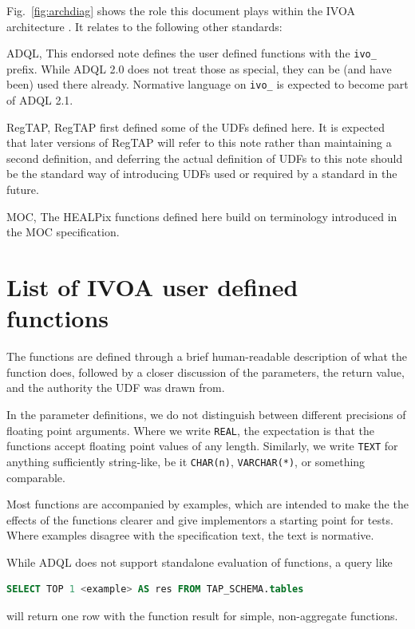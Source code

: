 \documentclass[11pt,a4paper]{ivoa}
\begin{document}
Fig.~\ref{fig:archdiag} shows the role this document plays within the
IVOA architecture \citep{note:VOARCH}.  It relates to the following
other standards:

\begin{bigdescription}
\item[ADQL, \citep{2008ivoa.spec.1030O}] This endorsed note defines the
user defined functions with the \verb|ivo_| prefix.  While ADQL 2.0
does not treat those as special, they can be (and have been) used there
already.  Normative language on \verb|ivo_| is expected to become
part of ADQL 2.1.

\item[RegTAP, \citep{2019ivoa.spec.1011D}] RegTAP first defined some of the
UDFs defined here.  It is expected that later versions of RegTAP will
refer to this note rather than maintaining a second definition, and
deferring the actual definition of UDFs to this note should be the
standard way of introducing UDFs used or required by a standard in the future.

\item[MOC, \citep{2019ivoa.spec.1007F}] The HEALPix functions defined
here build on terminology introduced in the MOC specification.
\end{bigdescription}


\section{List of IVOA user defined functions}

The functions are defined through a brief human-readable description of
what the function does, followed by a closer discussion of the
parameters, the return value, and the authority the UDF was drawn from.

In the parameter definitions, we do not distinguish between different
precisions of floating point arguments.  Where we write \texttt{REAL}, the
expectation is that the functions accept floating point values of any
length.  Similarly, we write \texttt{TEXT} for anything sufficiently
string-like, be it \texttt{CHAR(n)}, \texttt{VARCHAR(*)}, or something
comparable.

Most functions are accompanied by examples, which are intended to make
the the effects of the functions clearer and give implementors a
starting point for tests.  Where examples disagree with the
specification text, the text is normative.

While ADQL does not support standalone evaluation of functions, a query
like 
\begin{lstlisting}[language=SQL]
  SELECT TOP 1 <example> AS res FROM TAP_SCHEMA.tables
\end{lstlisting}
will return one row with the function result for simple, non-aggregate
functions.
\end{document}
